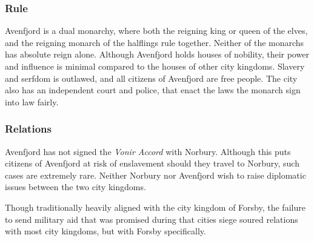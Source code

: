 \subsubsection*{Rule}

Avenfjord is a dual monarchy, where both the reigning king or queen of the
elves, and the reigning monarch of the halflings rule together. Neither of
the monarchs has absolute reign alone. Although Avenfjord holds houses of
nobility, their power and influence is minimal compared to the houses of
other city kingdoms. Slavery and serfdom is outlawed, and all citizens of
Avenfjord are free people. The city also has an independent court and police,
that enact the laws the monarch sign into law fairly.

\subsubsection*{Relations}

Avenfjord has not signed the \emph{Vonir Accord} with Norbury. Although this
puts citizens of Avenfjord at risk of enslavement should they travel to
Norbury, such cases are extremely rare. Neither Norbury nor Avenfjord wish
to raise diplomatic issues between the two city kingdoms.

Though traditionally heavily aligned with the city kingdom of Forsby, the
failure to send military aid that was promised during that cities siege
soured relations with most city kingdoms, but with Forsby specifically.
